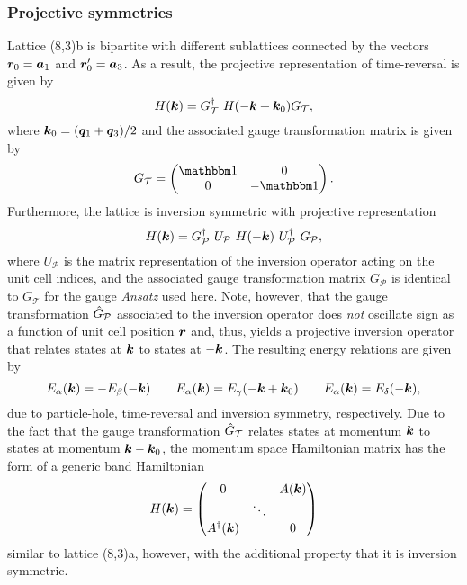 %
%
\subsubsection{Projective symmetries}
%
%
Lattice (8,3)b is bipartite with different sublattices connected by the vectors $\bm{r}_0 = \bm{a}_1$ and $\bm{r}'_0 = \bm{a}_3$.
As a result, the projective representation of time-reversal is given by
%
\begin{equation}
	H(\bm{k}) = G^{\dagger}_{\mathcal{T}}~H(-\bm{k} + \bm{k}_0) G_{\mathcal{T}},
\end{equation}
%
where $\bm{k}_0 = (\bm{q}_1 + \bm{q}_3)/2$ and the associated gauge transformation matrix is given by
%
\begin{equation}
	G_{\mathcal{T}} =
		\begin{pmatrix}
			\id & 0 \\
			0	& -\id
		\end{pmatrix}.
\end{equation}
%
Furthermore, the lattice is inversion symmetric with projective representation
%
\begin{equation}
	H(\bm{k}) = G^{\dagger}_{\mathcal{P}}~U_{\mathcal{P}}~H(-\bm{k})~U^{\dagger}_{\mathcal{P}}~G_{\mathcal{P}},
\end{equation}
%
where $U_{\mathcal{P}}$ is the matrix representation of the inversion operator acting on the unit cell indices, and the associated gauge transformation matrix $G_{\mathcal{P}}$ is identical to $G_{\mathcal{T}}$ for the gauge \textit{Ansatz} used here.
Note, however, that the gauge transformation $\hat{G}_{\mathcal{P}}$ associated to the inversion operator does \textit{not} oscillate sign as a function of unit cell position $\bm{r}$ and, thus, yields a projective inversion operator that relates states at $\bm{k}$ to states at $-\bm{k}$.
The resulting energy relations are given by
%
\begin{equation}
	E_{\alpha}(\bm{k}) = -E_{\beta}(-\bm{k}) \qquad E_{\alpha}(\bm{k}) = E_{\gamma}(-\bm{k} + \bm{k}_0) \qquad E_{\alpha}(\bm{k}) = E_{\delta}(-\bm{k}),
\end{equation}
%
due to particle-hole, time-reversal and inversion symmetry, respectively.
Due to the fact that the gauge transformation $\hat{G}_{\mathcal{T}}$ relates states at momentum $\bm{k}$ to states at momentum $\bm{k} - \bm{k}_0$, the momentum space Hamiltonian matrix has the form of a generic band Hamiltonian
%
\begin{equation}
	H(\bm{k}) = 
		\begin{pmatrix}
			0			&			& A(\bm{k}) 	\\
			& \ddots 	& 			\\
			A^{\dagger}(\bm{k})	&			& 0
		\end{pmatrix}
	\label{eq:chapter05_8_3bGenericHamiltonian}
\end{equation}
%
similar to lattice (8,3)a, however, with the additional property that it is inversion symmetric.


